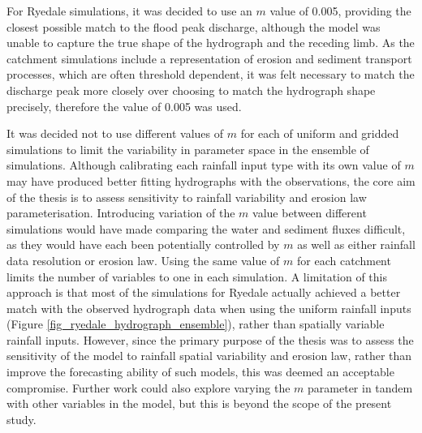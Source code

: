 For Ryedale simulations, it was decided to use an \(m\) value of 0.005, providing the closest possible match to the flood peak discharge, although the model was unable to capture the true shape of the hydrograph and the receding limb. As the catchment simulations include a representation of erosion and sediment transport processes, which are often threshold dependent, it was felt necessary to match the discharge peak more closely over choosing to match the hydrograph shape precisely, therefore the value of 0.005 was used.

It was decided not to use different values of \(m\) for each of uniform and gridded simulations to limit the variability in parameter space in the ensemble of simulations. Although calibrating each rainfall input type with its own value of \(m\) may have produced better fitting hydrographs with the observations, the core aim of the thesis is to assess sensitivity to rainfall variability and erosion law parameterisation. Introducing variation of the \(m\) value between different simulations would have made comparing the water and sediment fluxes difficult, as they would have each been potentially controlled by \(m\) as well as either rainfall data resolution or erosion law. Using the same value of \(m\) for each catchment limits the number of variables to one in each simulation. A limitation of this approach is that most of the simulations for Ryedale actually achieved a better match with the observed hydrograph data when using the uniform rainfall inputs (Figure \ref{fig_ryedale_hydrograph_ensemble}), rather than spatially variable rainfall inputs. However, since the primary purpose of the thesis was to assess the sensitivity of the model to rainfall spatial variability and erosion law, rather than improve the forecasting ability of such models, this was deemed an acceptable compromise. Further work could also explore varying the \(m\) parameter in tandem with other variables in the model, but this is beyond the scope of the present study. 




